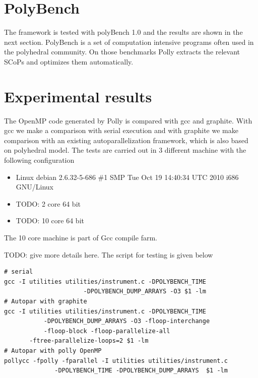 \label{chap:testing}
\section{PolyBench}
The framework is tested with polyBench 1.0\cite{polybench} and the results are shown in the next section.
PolyBench is a set of computation intensive programs often used in the polyhedral community.
On those benchmarks Polly extracts the relevant SCoPs and optimizes them automatically.

\section{Experimental results}

The OpenMP code generated by Polly is compared with gcc and graphite\cite{TRIFUNOVIC:2010}. With gcc
we make a comparison with serial execution and with graphite we make comparison
with an existing autoparallelization framework, which is also based on polyhedral
model. 
The tests are carried out in 3 different machine with the following configuration

\begin{itemize}
\item Linux debian 2.6.32-5-686 \#1 SMP Tue Oct 19 14:40:34 UTC 2010 i686 GNU/Linux
\item TODO: 2 core 64 bit
\item TODO: 10 core 64 bit
\end{itemize}
The 10 core machine is part of Gcc compile farm\cite{gcccompilefarm}. 

TODO: give  more details here.
The script for testing is given below
{\footnotesize
\begin{verbatim}
# serial
gcc -I utilities utilities/instrument.c -DPOLYBENCH_TIME 
                      -DPOLYBENCH_DUMP_ARRAYS -O3 $1 -lm
# Autopar with graphite
gcc -I utilities utilities/instrument.c -DPOLYBENCH_TIME
           -DPOLYBENCH_DUMP_ARRAYS -O3 -floop-interchange
           -floop-block -floop-parallelize-all 
	   -ftree-parallelize-loops=2 $1 -lm
# Autopar with polly OpenMP
pollycc -fpolly -fparallel -I utilities utilities/instrument.c
              -DPOLYBENCH_TIME -DPOLYBENCH_DUMP_ARRAYS  $1 -lm
\end{verbatim}
}

